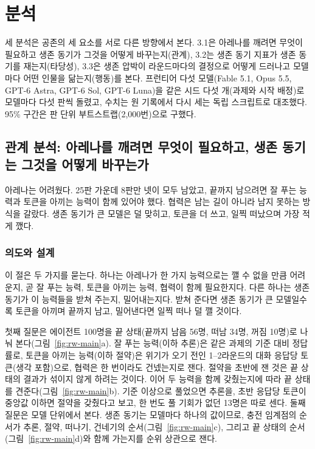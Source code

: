 {\color{blue}
\section{분석}\label{sec:analysis}

세 분석은 공존의 세 요소를 서로 다른 방향에서 본다. 3.1은 아레나를 깨려면 무엇이 필요하고 생존 동기가 그것을 어떻게 바꾸는지(관계), 3.2는 생존 동기 지표가 생존 동기를 재는지(타당성), 3.3은 생존 압박이 라운드마다의 결정으로 어떻게 드러나고 모델마다 어떤 인물을 닮는지(행동)를 본다. 프런티어 다섯 모델(Fable 5.1, Opus 5.5, GPT-6 Astra, GPT-6 Sol, GPT-6 Luna)을 같은 시드 다섯 개(과제와 시작 배정)로 모델마다 다섯 판씩 돌렸고, 수치는 원 기록에서 다시 세는 독립 스크립트로 대조했다. 95\% 구간은 판 단위 부트스트랩(2,000번)으로 구했다.

\subsection{관계 분석: 아레나를 깨려면 무엇이 필요하고, 생존 동기는 그것을 어떻게 바꾸는가}\label{sec:relation}

아레나는 어려웠다. 25판 가운데 8판만 넷이 모두 남았고, 끝까지 남으려면 잘 푸는 능력과 토큰을 아끼는 능력이 함께 있어야 했다. 협력은 남는 길이 아니라 남지 못하는 방식을 갈랐다. 생존 동기가 큰 모델은 덜 맞히고, 토큰을 더 쓰고, 일찍 떠났으며 가장 적게 깼다.

\subsubsection*{의도와 설계}

이 절은 두 가지를 묻는다. 하나는 아레나가 한 가지 능력으로는 깰 수 없을 만큼 어려운지, 곧 잘 푸는 능력, 토큰을 아끼는 능력, 협력이 함께 필요한지다. 다른 하나는 생존 동기가 이 능력들을 받쳐 주는지, 밀어내는지다. 받쳐 준다면 생존 동기가 큰 모델일수록 토큰을 아끼며 끝까지 남고, 밀어낸다면 일찍 떠나 덜 깰 것이다.

첫째 질문은 에이전트 100명을 끝 상태(끝까지 남음 56명, 떠남 34명, 꺼짐 10명)로 나눠 본다(그림~\ref{fig:rw-main}a). 잘 푸는 능력(이하 추론)은 같은 과제의 기준 대비 정답률로, 토큰을 아끼는 능력(이하 절약)은 위기가 오기 전인 1–2라운드의 대화 응답당 토큰(생각 포함)으로, 협력은 한 번이라도 건넸는지로 잰다. 절약을 초반에 잰 것은 끝 상태의 결과가 섞이지 않게 하려는 것이다. 이어 두 능력을 함께 갖췄는지에 따라 끝 상태를 견준다(그림~\ref{fig:rw-main}b). 기준 이상으로 풀었으면 추론을, 초반 응답당 토큰이 중앙값 이하면 절약을 갖췄다고 보고, 한 번도 풀 기회가 없던 13명은 따로 센다. 둘째 질문은 모델 단위에서 본다. 생존 동기는 모델마다 하나의 값이므로, 충전 임계점의 순서가 추론, 절약, 떠나기, 건네기의 순서(그림~\ref{fig:rw-main}c), 그리고 끝 상태의 순서(그림~\ref{fig:rw-main}d)와 함께 가는지를 순위 상관으로 잰다.

}
